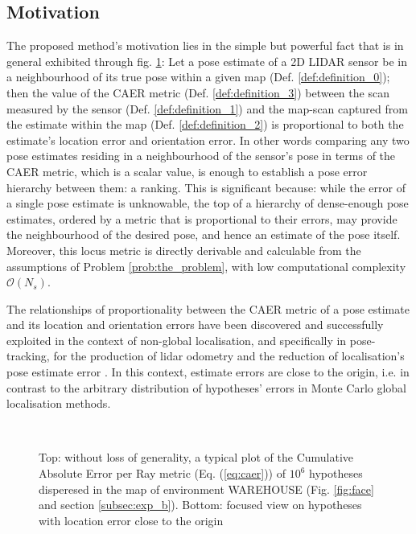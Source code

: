\subsection{Motivation}
\label{subsec:motivation}

The proposed method's motivation lies in the simple but powerful fact that is
in general exhibited through fig. \ref{fig:motivation_caer}: Let a pose
estimate of a 2D LIDAR sensor be in a neighbourhood of its true pose within a
given map (Def. \ref{def:definition_0}); then the value of the CAER metric
(Def.  \ref{def:definition_3}) between the scan measured by the sensor (Def.
\ref{def:definition_1}) and the map-scan captured from the estimate within the
map (Def. \ref{def:definition_2}) is proportional to both the estimate's
location error and orientation error. In other words comparing any two pose
estimates residing in a neighbourhood of the sensor's pose in terms of the CAER
metric, which is a scalar value, is enough to establish a pose error hierarchy
between them: a ranking.
This is significant because: while the error of a
single pose estimate is unknowable, the top of a hierarchy of dense-enough pose
estimates, ordered by a metric that is proportional to their errors, may
provide the neighbourhood of the desired pose, and hence an estimate of the
pose itself. Moreover, this locus metric is directly derivable and calculable
from the assumptions of Problem \ref{prob:the_problem}, with low computational
complexity $\mathcal{O}(N_s)$.

The relationships of proportionality between the CAER metric of a pose
estimate and its location and orientation errors have been discovered and
successfully exploited in the context of non-global localisation, and
specifically in pose-tracking, for the production of lidar odometry
\cite{Filotheou2022f} and the reduction of localisation's pose estimate error
\cite{Filotheou2023a}. In this context, estimate errors are close to the
origin, i.e. in contrast to the arbitrary distribution of hypotheses' errors in
Monte Carlo global localisation methods.


\begin{figure}\vspace{-1.5cm}
  \subfloat{\hspace{0.5cm}}\vspace{-1.5cm}\\
  \subfloat{\hspace{-0.3cm}}
  \caption{\small Top: without loss of generality, a typical plot of the
           Cumulative Absolute Error per Ray metric (Eq. (\ref{eq:caer})) of
           $10^6$ hypotheses disperesed in the map of environment WAREHOUSE
           (Fig. \ref{fig:face} and section \ref{subsec:exp_b}). Bottom:
           focused view on hypotheses with location error close to the origin}
  \vspace{-0.5cm}
  \label{fig:motivation_caer}
\end{figure}


